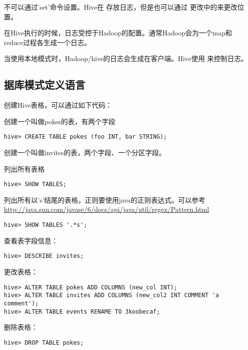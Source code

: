 \documentclass{article}
\begin{document}
不可以通过'set'命令设置。Hive在 存放日志，但是也可以通过
更改中的来更改位置。

在Hive执行的时候，日志受控于Hadoop的配置。通常Hadoop会为一个map和reduce过程各生成一个日志。

当使用本地模式时，Hadoop/hive的日志会生成在客户端。Hive使用 来控制日志。

\subsection{据库模式定义语言}
创建Hive表格，可以通过如下代码：

创建一个叫做pokes的表，有两个字段
\begin{verbatim}
hive> CREATE TABLE pokes (foo INT, bar STRING);
\end{verbatim}

创建一个叫做invites的表，两个字段、一个分区字段。

列出所有表格

\begin{verbatim}
hive> SHOW TABLES;
\end{verbatim}

列出所有以's'结尾的表格，正则要使用java的正则表达式。可以参考
\url{http://java.sun.com/javase/6/docs/api/java/util/regex/Pattern.html}

\begin{verbatim}
hive> SHOW TABLES '.*s';
\end{verbatim}

查看表字段信息：

\begin{verbatim}
hive> DESCRIBE invites;
\end{verbatim}

更改表格：

\begin{verbatim}
hive> ALTER TABLE pokes ADD COLUMNS (new_col INT);
hive> ALTER TABLE invites ADD COLUMNS (new_col2 INT COMMENT 'a comment');
hive> ALTER TABLE events RENAME TO 3koobecaf;
\end{verbatim}

删除表格：

\begin{verbatim}
hive> DROP TABLE pokes;
\end{verbatim}
\end{document}
